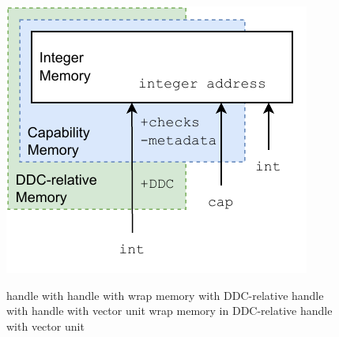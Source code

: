 \begin{figure}
    \centering
    \begin{minipage}[c]{.4\textwidth}
      \centering
      \includegraphics[width=\linewidth]{Figures/cheri_memory.pdf}
      \label{fig:emulatormemory}
    \end{minipage}\hfill%
    \begin{minipage}[c]{7.5cm}
        \centering
        {

        \small
      \begin{algorithmic}
            \State handle with 
                \State handle with 
            \Else{}
                \State wrap memory with DDC-relative
                \State handle with 
            \EndIf{}
                \State handle with vector unit
            \Else{}
                \State wrap memory in DDC-relative
                \State handle with vector unit
            \EndIf{}
        \EndIf{}
    \end{algorithmic}
        }
    \label{fig:module_algorithm}
    \end{minipage}
\end{figure}

